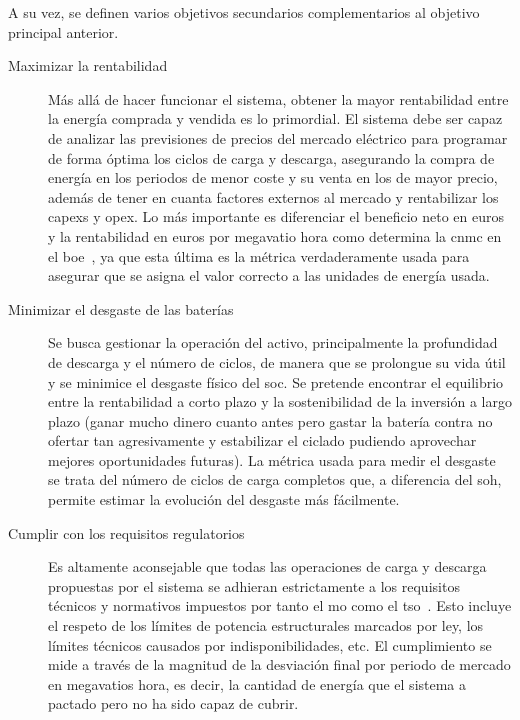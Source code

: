 A su vez, se definen varios objetivos secundarios complementarios al objetivo principal anterior.

\begin{description}

  \item[Maximizar la rentabilidad] Más allá de hacer funcionar el sistema, obtener la mayor rentabilidad entre la energía comprada y vendida es lo primordial. El sistema debe ser capaz de analizar las previsiones de precios del mercado eléctrico para programar de forma óptima los ciclos de carga y descarga, asegurando la compra de energía en los periodos de menor coste y su venta en los de mayor precio, además de tener en cuanta factores externos al mercado y rentabilizar los \glspl{capex} y \gls{opex}. Lo más importante es diferenciar el beneficio neto en euros y la rentabilidad en euros por megavatio hora como determina la \gls{cnmc} en el \gls{boe}~\cite{cnmc2025resolucion}, ya que esta última es la métrica verdaderamente usada para asegurar que se asigna el valor correcto a las unidades de energía usada.

  \item[Minimizar el desgaste de las baterías] Se busca gestionar la operación del activo, principalmente la profundidad de descarga y el número de ciclos, de manera que se prolongue su vida útil y se minimice el desgaste físico del \gls{soc}. Se pretende encontrar el equilibrio entre la rentabilidad a corto plazo y la sostenibilidad de la inversión a largo plazo (ganar mucho dinero cuanto antes pero gastar la batería contra no ofertar tan agresivamente y estabilizar el ciclado pudiendo aprovechar mejores oportunidades futuras). La métrica usada para medir el desgaste se trata del número de ciclos de carga completos que, a diferencia del \gls{soh}, permite estimar la evolución del desgaste más fácilmente.

  \item[Cumplir con los requisitos regulatorios] Es altamente aconsejable que todas las operaciones de carga y descarga propuestas por el sistema se adhieran estrictamente a los requisitos técnicos y normativos impuestos por tanto el \gls{mo} como el \gls{tso}~\cite{crespo2004resolucion}. Esto incluye el respeto de los límites de potencia estructurales marcados por ley, los límites técnicos causados por indisponibilidades, etc. El cumplimiento se mide a través de la magnitud de la desviación final por periodo de mercado en megavatios hora, es decir, la cantidad de energía que el sistema a pactado pero no ha sido capaz de cubrir.


\end{description}
